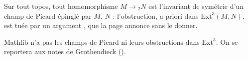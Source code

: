 \begin{encadre}
\begin{theoreme*}\nonverifie
Sur tout topos, tout homomorphisme $M \to {}_2N$ est l'invariant de symétrie d'un champ de Picard épinglé par $M$, $N$ : l'obstruction, a priori dans $\mathrm{Ext}^3(M, N)$, est tuée par un argument , que la page annonce  sans le donner.
\end{theoreme*}
\end{encadre}
{\small Mathlib n'a pas les champs de Picard ni leurs obstructions dans $\mathrm{Ext}^3$. On se reportera aux notes de Grothendieck ().\par}
